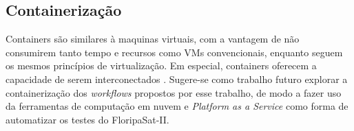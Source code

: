        \subsection{Containerização}
        \label{futuros:docker}
            Containers são similares à maquinas virtuais, com a vantagem de não consumirem tanto tempo e recursos como VMs convencionais, enquanto seguem os mesmos princípios de virtualização. Em especial, containers oferecem a capacidade de serem interconectados \cite{pahl-2015}. Sugere-se como trabalho futuro explorar a containerização dos \textit{workflows} propostos por esse trabalho, de modo a fazer uso da ferramentas de computação em nuvem e \textit{Platform as a Service} como forma de automatizar os testes do FloripaSat-II.
            
        